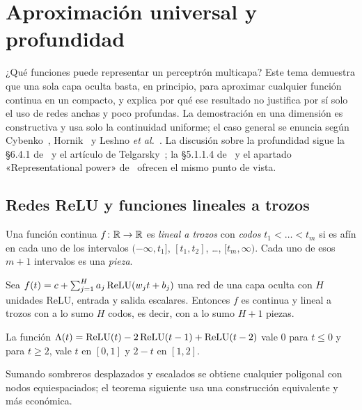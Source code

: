 \chapter{Aproximación universal y profundidad}
\label{tema:3}

¿Qué funciones puede representar un perceptrón multicapa? Este tema demuestra que una sola capa oculta basta, en principio, para aproximar cualquier función continua en un compacto, y explica por qué ese resultado no justifica por sí solo el uso de redes anchas y poco profundas. La demostración en una dimensión es constructiva y usa solo la continuidad uniforme; el caso general se enuncia según Cybenko~\cite{cybenko}, Hornik~\cite{hornik} y Leshno \emph{et al.}~\cite{leshno}. La discusión sobre la profundidad sigue la §6.4.1 de~\cite{gbc} y el artículo de Telgarsky~\cite{telgarsky}; la §5.1.1.4 de~\cite{d2l} y el apartado «Representational power» de~\cite{cs231n} ofrecen el mismo punto de vista.

\section{Redes ReLU y funciones lineales a trozos}

\begin{definicion}
Una función continua $f\colon\mathbb{R}\to\mathbb{R}$ es \emph{lineal a trozos} con \emph{codos} $t_1<\dots<t_m$ si es afín en cada uno de los intervalos $(-\infty,t_1]$, $[t_1,t_2]$, \dots, $[t_m,\infty)$. Cada uno de esos $m+1$ intervalos es una \emph{pieza}.
\end{definicion}

\begin{proposicion}\label{prop:piezas}
Sea $f(t)=c+\sum_{j=1}^{H}a_j\operatorname{ReLU}(w_jt+b_j)$ una red de una capa oculta con $H$ unidades ReLU, entrada y salida escalares. Entonces $f$ es continua y lineal a trozos con a lo sumo $H$ codos, es decir, con a lo sumo $H+1$ piezas.
\end{proposicion}

\begin{lema}[Sombrero]\label{lem:sombrero}
La función $\Lambda(t)=\operatorname{ReLU}(t)-2\operatorname{ReLU}(t-1)+\operatorname{ReLU}(t-2)$ vale $0$ para $t\le 0$ y para $t\ge 2$, vale $t$ en $[0,1]$ y $2-t$ en $[1,2]$.
\end{lema}

Sumando sombreros desplazados y escalados se obtiene cualquier poligonal con nodos equiespaciados; el teorema siguiente usa una construcción equivalente y más económica.

